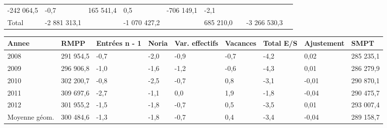 \begin{longtable}[]{@{}lllllllll@{}}
\begin{minipage}[t]{0.16\columnwidth}
-242 064,5\strut
\end{minipage} & \begin{minipage}[t]{0.06\columnwidth}\raggedright
-0,7\strut
\end{minipage} & \begin{minipage}[t]{0.12\columnwidth}\raggedright
165 541,4\strut
\end{minipage} & \begin{minipage}[t]{0.06\columnwidth}\raggedright
0,5\strut
\end{minipage} & \begin{minipage}[t]{0.10\columnwidth}\raggedright
-706 149,1\strut
\end{minipage} & \begin{minipage}[t]{0.06\columnwidth}\raggedright
-2,1\strut
\end{minipage}\tabularnewline
\begin{minipage}[t]{0.05\columnwidth}\raggedright
Total\strut
\end{minipage} & \begin{minipage}[t]{0.10\columnwidth}\raggedright
-2 881 313,1\strut
\end{minipage} & \begin{minipage}[t]{0.06\columnwidth}\raggedright
\strut
\end{minipage} & \begin{minipage}[t]{0.16\columnwidth}\raggedright
-1 070 427,2\strut
\end{minipage} & \begin{minipage}[t]{0.06\columnwidth}\raggedright
\strut
\end{minipage} & \begin{minipage}[t]{0.12\columnwidth}\raggedright
685 210,0\strut
\end{minipage} & \begin{minipage}[t]{0.06\columnwidth}\raggedright
\strut
\end{minipage} & \begin{minipage}[t]{0.10\columnwidth}\raggedright
-3 266 530,3\strut
\end{minipage} & \begin{minipage}[t]{0.06\columnwidth}\raggedright
\strut
\end{minipage}\tabularnewline
\bottomrule
\end{longtable}

\begin{longtable}[]{@{}lllllllll@{}}
\toprule
Annee & RMPP & Entrées n - 1 & Noria & Var. effectifs & Vacances & Total
E/S & Ajustement & SMPT\tabularnewline
\midrule
\endhead
2008 & 291 954,5 & -0,7 & -2,0 & -0,9 & -0,7 & -4,2 & 0,02 & 285
235,1\tabularnewline
2009 & 296 906,8 & -1,0 & -1,6 & -1,2 & -0,6 & -4,3 & 0,01 & 286
279,9\tabularnewline
2010 & 302 200,7 & -0,8 & -2,5 & -0,7 & 0,8 & -3,1 & -0,01 & 290
870,1\tabularnewline
2011 & 309 697,6 & -2,7 & -1,1 & 0,0 & 1,9 & -1,8 & -0,04 & 290
475,7\tabularnewline
2012 & 301 955,2 & -1,5 & -1,8 & -0,7 & 0,5 & -3,5 & 0,01 & 293
007,4\tabularnewline
Moyenne géom. & 300 484,6 & -1,3 & -1,8 & -0,7 & 0,4 & -3,4 & -0,04 &
289 158,7\tabularnewline
\bottomrule
\end{longtable}

